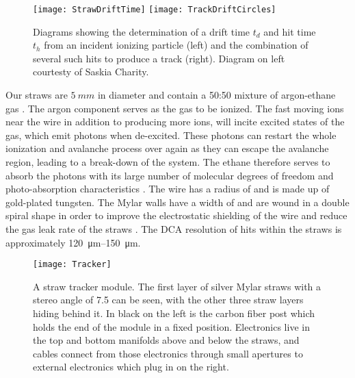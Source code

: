 \begin{figure}[]
\centering
        \texttt{[image: StrawDriftTime]}
    \hspace{1cm}
        \texttt{[image: TrackDriftCircles]}
\caption[Straw tracker drift circles]{Diagrams showing the determination of a drift time $t_{d}$ and hit time $t_{h}$ from an incident ionizing particle (left) and the combination of several such hits to produce a track (right). Diagram on left courtesty of Saskia Charity.}
\label{fig:driftcircles}
\end{figure}




Our straws are $\SI{5}{mm}$ in diameter and contain a 50:50 mixture of argon-ethane gas \cite{WTThesis}. The argon component serves as the gas to be ionized. The fast moving ions near the wire in addition to producing more ions, will incite excited states of the gas, which emit photons when de-excited. These photons can restart the whole ionization and avalanche process over again as they can escape the avalanche region, leading to a break-down of the system. The ethane therefore serves to absorb the photons with its large number of molecular degrees of freedom and photo-absorption characteristics \cite{WTThesis}. The wire has a radius of  and is made up of gold-plated tungsten. The Mylar walls have a width of  and are wound in a double spiral shape in order to improve the electrostatic shielding of the wire and reduce the gas leak rate of the straws \cite{WTThesis}. The DCA resolution of hits within the straws is approximately \SIrange{120}{150}{\micro m}.


\begin{figure}[]
    \centering
    \texttt{[image: Tracker]}
    \caption[Tracker module]{A straw tracker module. The first layer of silver Mylar straws with a stereo angle of 7.5\textdegree{} can be seen, with the other three straw layers hiding behind it. In black on the left is the carbon fiber post which holds the end of the module in a fixed position. Electronics live in the top and bottom manifolds above and below the straws, and cables connect from those electronics through small apertures to external electronics which plug in on the right.}
    \label{fig:tracker}
\end{figure}




